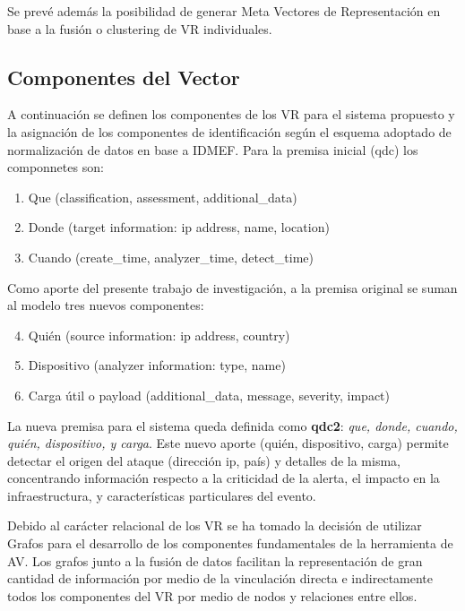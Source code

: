 \documentclass[a4paper]{./plantillas/llncs}
\begin{document}
Se prevé además la posibilidad de generar Meta Vectores de Representación en base a la fusión o clustering de VR individuales.
	

\subsection{Componentes del Vector}
    

A continuación se definen los componentes de los VR para el sistema propuesto y la asignación de los componentes de identificación según el esquema adoptado de normalización de datos en base a IDMEF. \newline
Para la premisa inicial (qdc) los componnetes son: 
\begin{enumerate}
\item Que (classification, assessment, additional\_data) 
\item Donde (target information: ip address, name, location)
\item Cuando (create\_time, analyzer\_time, detect\_time)
\end{enumerate}

Como aporte del presente trabajo de investigación, a la premisa original se suman al modelo tres nuevos componentes:
\begin{enumerate}
\setcounter{enumi}{3}
\item Quién (source information: ip address, country)
\item Dispositivo (analyzer information: type, name)
\item Carga útil o payload (additional\_data, message, severity, impact)
\end{enumerate}




La nueva premisa para el sistema queda definida como {\bfseries qdc2}: {\itshape que, donde, cuando, quién, dispositivo, y carga}. Este nuevo aporte (quién, dispositivo, carga) permite detectar el origen del ataque (dirección ip, país) y detalles de la misma, concentrando información respecto a la criticidad de la alerta, el impacto en la infraestructura, y características particulares del evento.

Debido al carácter relacional de los VR se ha tomado la decisión de utilizar Grafos para el desarrollo de los componentes fundamentales de la herramienta de AV. Los grafos junto a la fusión de datos facilitan la representación de gran cantidad de información por medio de la vinculación directa e indirectamente todos los componentes del VR por medio de nodos y relaciones entre ellos.
\end{document}
